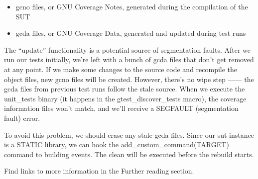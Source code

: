 \begin{itemize}
\item
gcno files, or GNU Coverage Notes, generated during the compilation of the SUT

\item
gcda files, or GNU Coverage Data, generated and updated during test runs
\end{itemize}

The “update” functionality is a potential source of segmentation faults. After we run our tests initially, we’re left with a bunch of gcda files that don’t get removed at any point. If we make some changes to the source code and recompile the object files, new gcno files will be created. However, there’s no wipe step —— the gcda files from previous test runs follow the stale source. When we execute the unit\_tests binary (it happens in the gtest\_discover\_tests macro), the coverage information files won’t match, and we’ll receive a SEGFAULT (segmentation fault) error.

To avoid this problem, we should erase any stale gcda files. Since our sut instance is a STATIC library, we can hook the add\_custom\_command(TARGET) command to building events. The clean will be executed before the rebuild starts.

Find links to more information in the Further reading section.





